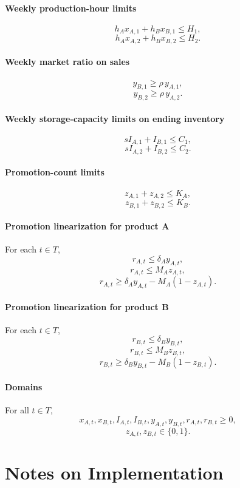 \paragraph{Weekly production-hour limits}
\[
h_A x_{A,1} + h_B x_{B,1} \le H_1,
\]
\[
h_A x_{A,2} + h_B x_{B,2} \le H_2.
\]

\paragraph{Weekly market ratio on sales}
\[
y_{B,1} \ge \rho\, y_{A,1},
\]
\[
y_{B,2} \ge \rho\, y_{A,2}.
\]

\paragraph{Weekly storage-capacity limits on ending inventory}
\[
s I_{A,1} + I_{B,1} \le C_1,
\]
\[
s I_{A,2} + I_{B,2} \le C_2.
\]

\paragraph{Promotion-count limits}
\[
z_{A,1} + z_{A,2} \le K_A,
\]
\[
z_{B,1} + z_{B,2} \le K_B.
\]

\paragraph{Promotion linearization for product A}
For each $t \in T$,
\[
r_{A,t} \le \delta_A y_{A,t},
\]
\[
r_{A,t} \le M_A z_{A,t},
\]
\[
r_{A,t} \ge \delta_A y_{A,t} - M_A(1-z_{A,t}).
\]

\paragraph{Promotion linearization for product B}
For each $t \in T$,
\[
r_{B,t} \le \delta_B y_{B,t},
\]
\[
r_{B,t} \le M_B z_{B,t},
\]
\[
r_{B,t} \ge \delta_B y_{B,t} - M_B(1-z_{B,t}).
\]

\paragraph{Domains}
For all $t \in T$,
\[
x_{A,t},x_{B,t},I_{A,t},I_{B,t},y_{A,t},y_{B,t},r_{A,t},r_{B,t} \ge 0,
\]
\[
z_{A,t},z_{B,t} \in \{0,1\}.
\]

\section*{Notes on Implementation}

